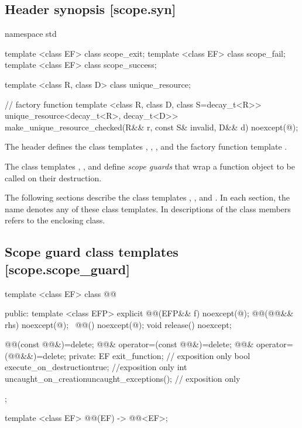 \documentclass[ebook,11pt,article]{memoir}
\begin{document}
\subsection{Header  synopsis [scope.syn]}


\begin{codeblock}
namespace std {
template <class EF>
  class scope_exit;
template <class EF>
  class scope_fail;
template <class EF>
  class scope_success;

template <class R, class D>
  class unique_resource;

// factory function
template <class R, class D, class S=decay_t<R>>
  unique_resource<decay_t<R>, decay_t<D>>
  make_unique_resource_checked(R&& r, const S& invalid, D&& d) noexcept(@\seebelow@);
}
\end{codeblock}

\pnum
The header   defines the class templates , , ,  and
the factory function template .

\pnum 
The class templates , , and  define\emph{ scope guards} that wrap a function object to be called on their destruction.

\pnum
The following sections describe the class templates , , and . In each section, the name  denotes any of these class templates. In descriptions of the class members  refers to the enclosing class.

\newpage
\subsection {Scope guard class templates [scope.scope_guard]}

\begin{codeblock}
template <class EF>
class @@ {
public:
  template <class EFP>
  explicit @@(EFP&& f) noexcept(@\seebelow@);
  @@(@@&& rhs) noexcept(@\seebelow@);
  ~@@() noexcept(@\seebelow@);
  void release() noexcept;

  @@(const @@&)=delete;
  @@& operator=(const @@&)=delete;
  @@& operator=(@@&&)=delete;
private:
  EF exit_function;    // exposition only
  bool execute_on_destruction{true}; //exposition only
  int  uncaught_on_creation{uncaught_exceptions()}; // exposition only
};

template <class EF>
@@(EF) -> @@<EF>;

\end{codeblock}
\end{document}
